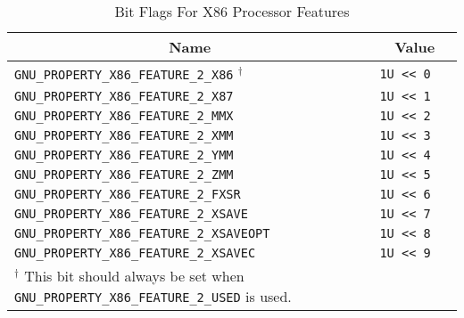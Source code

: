 \begin{table}[H]
\Hrule
  \caption{Bit Flags For X86 Processor Features}
  \begin{center}
    \begin{tabular}[t]{l|l}
      \multicolumn{1}{c}{Name} & \multicolumn{1}{c}{Value} \\
      \hline
     \texttt{GNU_PROPERTY_X86_FEATURE_2_X86} $^\dagger$ & \texttt{1U << 0} \\
     \texttt{GNU_PROPERTY_X86_FEATURE_2_X87} & \texttt{1U << 1} \\
     \texttt{GNU_PROPERTY_X86_FEATURE_2_MMX} & \texttt{1U << 2} \\
     \texttt{GNU_PROPERTY_X86_FEATURE_2_XMM} & \texttt{1U << 3} \\
     \texttt{GNU_PROPERTY_X86_FEATURE_2_YMM} & \texttt{1U << 4} \\
     \texttt{GNU_PROPERTY_X86_FEATURE_2_ZMM} & \texttt{1U << 5} \\
     \texttt{GNU_PROPERTY_X86_FEATURE_2_FXSR} & \texttt{1U << 6} \\
     \texttt{GNU_PROPERTY_X86_FEATURE_2_XSAVE} & \texttt{1U << 7} \\
     \texttt{GNU_PROPERTY_X86_FEATURE_2_XSAVEOPT} & \texttt{1U << 8} \\
     \texttt{GNU_PROPERTY_X86_FEATURE_2_XSAVEC} & \texttt{1U << 9} \\
    \cline{1-2}
    \multicolumn{2}{p{13cm}}{\small $^\dagger$ This bit should always
    be set when \texttt{GNU_PROPERTY_X86_FEATURE_2_USED} is used.}\\
    \end{tabular}
  \end{center}
\end{table}

